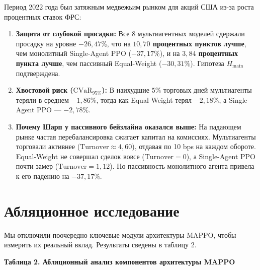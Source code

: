 \documentclass[11pt,a4paper]{article}
\begin{document}
Период 2022 года был затяжным медвежьим рынком для акций США из-за роста процентных ставок ФРС:
\begin{enumerate}[leftmargin=*]
\item \textbf{Защита от глубокой просадки:} Все 8 мультиагентных моделей сдержали просадку на уровне \textbf{$-26{,}47\%$}, что на \textbf{$10{,}70$ процентных пунктов лучше}, чем монолитный Single-Agent PPO ($-37{,}17\%$), и на \textbf{$3{,}84$ процентных пункта лучше}, чем пассивный Equal-Weight ($-30{,}31\%$). Гипотеза $H_{\text{main}}$ подтверждена.
\item \textbf{Хвостовой риск ($\text{CVaR}_{95\%}$):} В наихудшие $5\%$ торговых дней мультиагенты теряли в среднем $-1{,}86\%$, тогда как Equal-Weight терял $-2{,}18\%$, а Single-Agent PPO --- $-2{,}78\%$.
\item \textbf{Почему Шарп у пассивного бейзлайна оказался выше:} На падающем рынке частая перебалансировка сжигает капитал на комиссиях. Мультиагенты торговали активнее ($\text{Turnover} \approx 4{,}60$), отдавая по 10 bps на каждом обороте. Equal-Weight не совершал сделок вовсе ($\text{Turnover} = 0$), а Single-Agent PPO почти замер ($\text{Turnover} = 1{,}12$). Но пассивность монолитного агента привела к его падению на $-37{,}17\%$.
\end{enumerate}

\section{Абляционное исследование}

Мы отключили поочередно ключевые модули архитектуры MAPPO, чтобы измерить их реальный вклад. Результаты сведены в таблицу 2.

\vspace{0.5em}
\noindent\textbf{Таблица 2. Абляционный анализ компонентов архитектуры MAPPO}
\vspace{0.3em}
\end{document}
